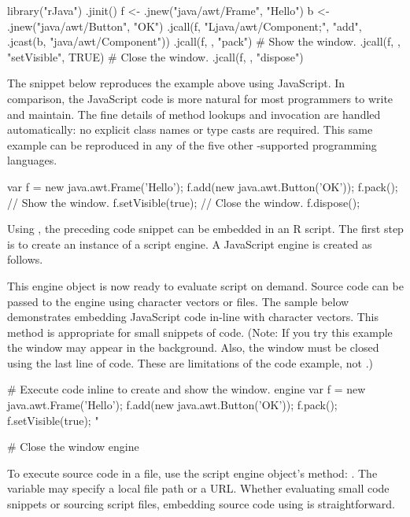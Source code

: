 \begin{example}
library("rJava")
.jinit()
f <- .jnew("java/awt/Frame", "Hello")
b <- .jnew("java/awt/Button", "OK")
.jcall(f, "Ljava/awt/Component;", "add", .jcast(b, "java/awt/Component"))
.jcall(f, , "pack")
# Show the window.
.jcall(f, , "setVisible", TRUE)
# Close the window.
.jcall(f, , "dispose")
\end{example}

The snippet below reproduces the  example above using JavaScript. In comparison, the JavaScript code is more natural for most programmers to write and maintain. The fine details of method lookups and invocation are handled automatically: no explicit class names or type casts are required. This same example can be reproduced in any of the five other -supported programming languages.

\begin{example}
var f = new java.awt.Frame('Hello');
f.add(new java.awt.Button('OK'));
f.pack();
// Show the window.
f.setVisible(true);
// Close the window.
f.dispose();
\end{example}

Using , the preceding code snippet can be embedded in an R script. The first step is to create an instance of a script engine. A JavaScript engine is created as follows.

This engine object is now ready to evaluate script on demand. Source code can be passed to the engine using character vectors or files. The sample below demonstrates embedding JavaScript code in-line with character vectors. This method is appropriate for small snippets of code. (Note: If you try this example the window may appear in the background. Also, the window must be closed using the last line of code. These are limitations of the code example, not .)

\begin{example}
# Execute code inline to create and show the window.
engine %
  var f = new java.awt.Frame('Hello');
  f.add(new java.awt.Button('OK'));
  f.pack();
  f.setVisible(true);
"

# Close the window
engine %
\end{example}
To execute source code in a file, use the script engine object's  method:
\newline {}. The variable  may specify a local file path or a URL. Whether evaluating small code snippets or sourcing script files, embedding source code using  is straightforward.

